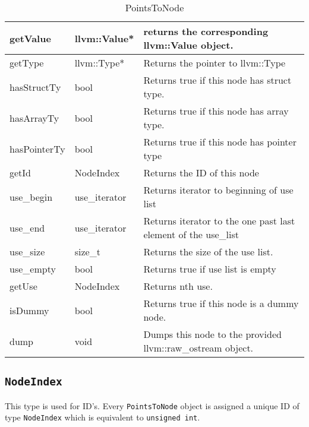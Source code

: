 \documentclass[a4paper,11pt]{report}
\begin{document}
\begin{table}[]
\centering
\caption{PointsToNode}
\label{points-to-node}
\begin{tabular}{|l|l|l|}
\hline
getValue     & llvm::Value*  & returns the corresponding llvm::Value object.                               \\ \hline
getType      & llvm::Type*   & Returns the pointer to llvm::Type                                           \\ \hline
hasStructTy  & bool          & Returns true if this node has struct type.                                  \\ \hline
hasArrayTy   & bool          & Returns true if this node has array type.                                   \\ \hline
hasPointerTy & bool          & Returns true if this node has pointer type                                  \\ \hline
getId        & NodeIndex     & Returns the ID of this node                                                 \\ \hline
use\_begin   & use\_iterator & Returns iterator to beginning of use list                                   \\ \hline
use\_end     & use\_iterator & Returns iterator to the one past last element of the use\_list              \\ \hline
use\_size    & size\_t       & Returns the size of the use list.                                           \\ \hline
use\_empty   & bool          & Returns true if use list is empty                                           \\ \hline
getUse       & NodeIndex     & Returns nth use.                                                            \\ \hline
isDummy      & bool          & Returns true if this node is a dummy node.                                  \\ \hline
dump         & void          & Dumps this node to the provided llvm::raw\_ostream object.                  \\ \hline
\end{tabular}
\end{table}



\subsection{\texttt{NodeIndex}}
This type is used for ID's. Every \texttt{PointsToNode} object is assigned
a unique ID of type \texttt{NodeIndex} which is equivalent to \texttt{unsigned int}.
\end{document}

